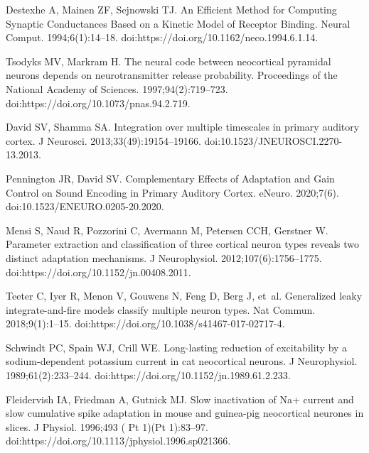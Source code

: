 \documentclass[10pt,letterpaper]{article}
\begin{document}
\begin{thebibliography}{100}
  Destexhe A, Mainen ZF, Sejnowski TJ.
  \newblock An Efficient Method for Computing Synaptic Conductances Based on a
    Kinetic Model of Receptor Binding.
  \newblock Neural Comput. 1994;6(1):14--18.
  \newblock doi:{https://doi.org/10.1162/neco.1994.6.1.14}.
  
  Tsodyks MV, Markram H.
  \newblock The neural code between neocortical pyramidal neurons depends on
    neurotransmitter release probability.
  \newblock Proceedings of the National Academy of Sciences. 1997;94(2):719--723.
  \newblock doi:{https://doi.org/10.1073/pnas.94.2.719}.
  
  David SV, Shamma SA.
  \newblock Integration over multiple timescales in primary auditory cortex.
  \newblock J Neurosci. 2013;33(49):19154--19166.
  \newblock doi:{10.1523/JNEUROSCI.2270-13.2013}.
  
  Pennington JR, David SV.
  \newblock Complementary Effects of Adaptation and Gain Control on Sound
    Encoding in Primary Auditory Cortex.
  \newblock eNeuro. 2020;7(6).
  \newblock doi:{10.1523/ENEURO.0205-20.2020}.
  
  Mensi S, Naud R, Pozzorini C, Avermann M, Petersen CCH, Gerstner W.
  \newblock Parameter extraction and classification of three cortical neuron
    types reveals two distinct adaptation mechanisms.
  \newblock J Neurophysiol. 2012;107(6):1756--1775.
  \newblock doi:{https://doi.org/10.1152/jn.00408.2011}.
  
  Teeter C, Iyer R, Menon V, Gouwens N, Feng D, Berg J, et~al.
  \newblock Generalized leaky integrate-and-fire models classify multiple neuron
    types.
  \newblock Nat Commun. 2018;9(1):1--15.
  \newblock doi:{https://doi.org/10.1038/s41467-017-02717-4}.
  
  Schwindt PC, Spain WJ, Crill WE.
  \newblock Long-lasting reduction of excitability by a sodium-dependent
    potassium current in cat neocortical neurons.
  \newblock J Neurophysiol. 1989;61(2):233--244.
  \newblock doi:{https://doi.org/10.1152/jn.1989.61.2.233}.
  
  Fleidervish IA, Friedman A, Gutnick MJ.
  \newblock Slow inactivation of Na+ current and slow cumulative spike adaptation
    in mouse and guinea-pig neocortical neurones in slices.
  \newblock J Physiol. 1996;493 ( Pt 1)(Pt 1):83--97.
  \newblock doi:{https://doi.org/10.1113/jphysiol.1996.sp021366}.
  

\end{thebibliography}
\end{document}
